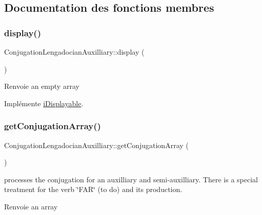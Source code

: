 \subsection{Documentation des fonctions membres}
\hypertarget{classConjugationLengadocianAuxilliary_a4edf29f1f54605fc5876ff675827672d}{}\label{classConjugationLengadocianAuxilliary_a4edf29f1f54605fc5876ff675827672d} 
\subsubsection{\texorpdfstring{display()}{display()}}
{\footnotesize\ttfamily Conjugation\+Lengadocian\+Auxilliary\+::display (\begin{DoxyParamCaption}{ }\end{DoxyParamCaption})}

\begin{DoxyReturn}{Renvoie}
an empty array 
\end{DoxyReturn}


Implémente \hyperlink{interfaceiDisplayable}{i\+Displayable}.

\hypertarget{classConjugationLengadocianAuxilliary_a19fa4af3fd6382641c641a6eebb9ad68}{}\label{classConjugationLengadocianAuxilliary_a19fa4af3fd6382641c641a6eebb9ad68} 
\subsubsection{\texorpdfstring{get\+Conjugation\+Array()}{getConjugationArray()}}
{\footnotesize\ttfamily Conjugation\+Lengadocian\+Auxilliary\+::get\+Conjugation\+Array (\begin{DoxyParamCaption}{ }\end{DoxyParamCaption})}

processes the conjugation for an auxilliary and semi-\/auxilliary. There is a special treatment for the verb \char`\"{}\+F\+A\+R\char`\"{} (to do) and its production. \begin{DoxyReturn}{Renvoie}
an array 
\end{DoxyReturn}
\hypertarget{classConjugationLengadocianAuxilliary_a931f205d57b485b89504d879cba60230}{}\label{classConjugationLengadocianAuxilliary_a931f205d57b485b89504d879cba60230} 
